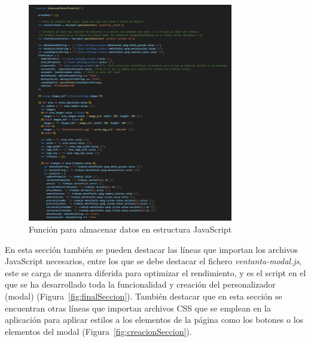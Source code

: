 \documentclass[12pt]{article}
\begin{document}
\begin{figure}[ht]
    \centering
    \includegraphics[width=0.8\textwidth]{imagenesUS3-section/funcionAlmacenarDatosProductos.png}
    \caption{\label{fig:cargardatos} Función para almacenar datos en estructura JavaScript}
    \vspace{\fill}
\end{figure}

En esta sección también se pueden destacar las líneas que importan los archivos JavaScript necesarios, entre los que se debe destacar
el fichero \textit{ventanta-modal.js}, este se carga de manera diferida para optimizar el rendimiento, y es el script en el que se ha desarrollado toda la funcionalidad y creación del
personalizador (modal) (Figura~\ref{fig:finalSeccion}). También destacar que en esta sección se encuentran otras líneas que importan archivos CSS que se emplean en la aplicación para aplicar estilos 
a los elementos de la página como los botones o los elementos del modal (Figura~\ref{fig:creacionSeccion}).
\end{document}
